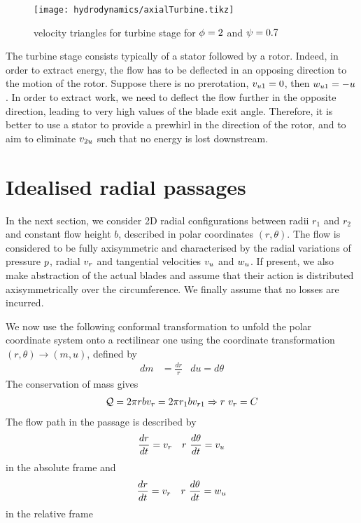 \begin{figure}[!h]
  \centering
  \texttt{[image: hydrodynamics/axialTurbine.tikz]}
  \caption{velocity triangles for turbine stage for $\phi = 2$ and $\psi = 0.7$}
  \label{fig:axialTurbineVelocity}
\end{figure}

The turbine stage consists typically of a stator followed by a
rotor. Indeed, in order to extract energy, the flow has to be
deflected in an opposing direction to the motion of the rotor. Suppose
there is no prerotation, \ie $v_{u 1} = 0$, then $w_{u 1} = -
u$. In order to extract work, we need to deflect the flow further
in the opposite direction, leading to very high values of the blade
exit angle.  Therefore, it is better to use a stator to provide a
prewhirl in the direction of the rotor, and to aim to eliminate
$v_{2u}$ such that no energy is lost downstream.

\section{Idealised radial passages}
\label{sec:idealRadial}


In the next section, we consider 2D radial configurations between
radii $r_1$ and $r_2$ and constant flow height $b$, described in polar
coordinates $(r,\theta)$. The flow is considered to be fully
axisymmetric and characterised by the radial variations of pressure
$p$, radial $v_r$ and tangential velocities $v_{u}$ and
$w_{u}$. If present, we also make abstraction of the actual
blades and assume that their action is distributed axisymmetrically
over the circumference. We finally assume that no losses are incurred.

We now use the following conformal transformation to unfold the polar
coordinate system onto a rectilinear one using the coordinate
transformation $(r,\theta) \rightarrow (m,u)$, defined by
\begin{align*}
  dm &= \frac{dr}{r} & du = d\theta
\end{align*}
The conservation of mass gives
\begin{align*}
  \mathcal Q = 2 \pi r b v_r = 2 \pi r_1 b v_{r1} \Rightarrow r~v_r = C
\end{align*}
The flow path in the passage is described by 
\begin{align*}
  \frac{dr}{dt} &= v_r & r~\frac{d\theta}{dt} = v_{u}
\end{align*}
in the absolute frame and 
\begin{align*}
  \frac{dr}{dt} &= v_r & r~\frac{d\theta}{dt} = w_{u}
\end{align*}
in the relative frame


